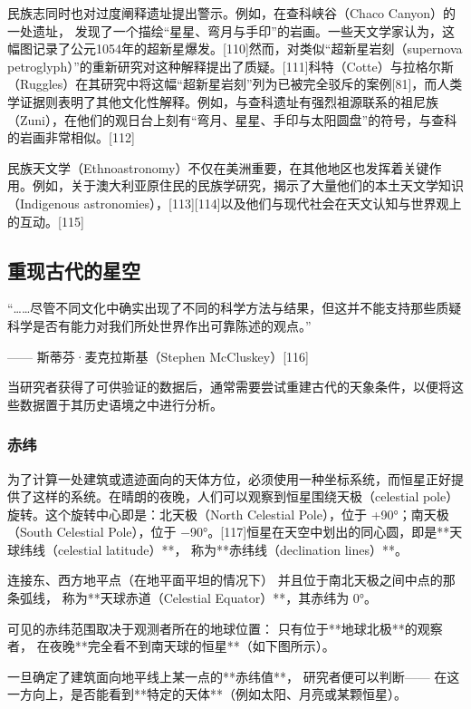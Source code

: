 民族志同时也对过度阐释遗址提出警示。例如，在查科峡谷（Chaco Canyon）的一处遗址，
发现了一个描绘“星星、弯月与手印”的岩画。一些天文学家认为，这幅图记录了公元1054年的超新星爆发。[110]然而，对类似“超新星岩刻（supernova petroglyph）”的重新研究对这种解释提出了质疑。[111]科特（Cotte）与拉格尔斯（Ruggles）在其研究中将这幅“超新星岩刻”列为已被完全驳斥的案例[81]，而人类学证据则表明了其他文化性解释。例如，与查科遗址有强烈祖源联系的祖尼族（Zuni），在他们的观日台上刻有“弯月、星星、手印与太阳圆盘”的符号，与查科的岩画非常相似。[112]

民族天文学（Ethnoastronomy）不仅在美洲重要，在其他地区也发挥着关键作用。例如，关于澳大利亚原住民的民族学研究，揭示了大量他们的本土天文学知识（Indigenous astronomies），[113][114]以及他们与现代社会在天文认知与世界观上的互动。[115]
\subsection{重现古代的星空}
“……尽管不同文化中确实出现了不同的科学方法与结果，但这并不能支持那些质疑科学是否有能力对我们所处世界作出可靠陈述的观点。”

—— 斯蒂芬·麦克拉斯基（Stephen McCluskey）[116]

当研究者获得了可供验证的数据后，通常需要尝试重建古代的天象条件，以便将这些数据置于其历史语境之中进行分析。
\subsubsection{赤纬}
为了计算一处建筑或遗迹面向的天体方位，必须使用一种坐标系统，而恒星正好提供了这样的系统。在晴朗的夜晚，人们可以观察到恒星围绕天极（celestial pole）旋转。这个旋转中心即是：北天极（North Celestial Pole），位于 +90°；南天极（South Celestial Pole），位于 −90°。[117]恒星在天空中划出的同心圆，即是**天球纬线（celestial latitude）**，
称为**赤纬线（declination lines）**。

连接东、西方地平点（在地平面平坦的情况下）
并且位于南北天极之间中点的那条弧线，
称为**天球赤道（Celestial Equator）**，其赤纬为 0°。

可见的赤纬范围取决于观测者所在的地球位置：
只有位于**地球北极**的观察者，
在夜晚**完全看不到南天球的恒星**（如下图所示）。

一旦确定了建筑面向地平线上某一点的**赤纬值**，
研究者便可以判断——
在这一方向上，是否能看到**特定的天体**（例如太阳、月亮或某颗恒星）。
